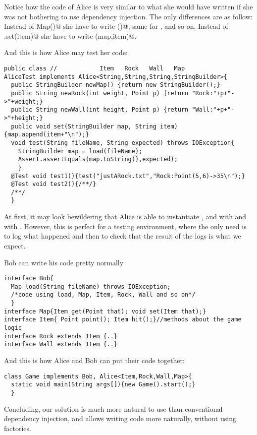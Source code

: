 \documentclass[submission,copyright,creativecommons]{eptcs}
\begin{document}
Notice how the code of Alice is very similar to what she would have written
if she was not bothering to use dependency injection. The
only differences are as follow:
Instead of \Q@new Map()@ she have to write \Q@newMap()@; same for
\Q@Rock@, \Q@Wall@ and so on.
Instead of \Q@map.set(item)@ she have to write \Q@set(map,item)@.

And this is how Alice may test her code:
\begin{lstlisting}
public class //            Item   Rock   Wall   Map
AliceTest implements Alice<String,String,String,StringBuilder>{
  public StringBuilder newMap() {return new StringBuilder();}
  public String newRock(int weight, Point p) {return "Rock:"+p+"->"+weight;}
  public String newWall(int height, Point p) {return "Wall:"+p+"->"+height;}
  public void set(StringBuilder map, String item) {map.append(item+"\n");}
  void test(String fileName, String expected) throws IOException{
    StringBuilder map = load(fileName);
    Assert.assertEquals(map.toString(),expected);
    }
  @Test void test1(){test("justARock.txt","Rock:Point(5,6)->35\n");}
  @Test void test2(){/**/}
  /**/
  }
\end{lstlisting}
At first, it may look bewildering that Alice is able to instantiate
\Q@Item@, \Q@Rock@ and \Q@Wall@ with \Q@String@ and \Q@Map@ with
\Q@StringBuilder@. However, this is perfect for a testing environment, where
the only need is to log what happened and then to check that the result
of the logs is what we expect.

Bob can write his code pretty normally
\begin{lstlisting}
interface Bob{
  Map load(String fileName) throws IOException;
  /*code using load, Map, Item, Rock, Wall and so on*/
  }
interface Map{Item get(Point that); void set(Item that);}
interface Item{ Point point(); Item hit();}//methods about the game logic
interface Rock extends Item {..}
interface Wall extends Item {..}
\end{lstlisting}
And this is how Alice and Bob can put their code together:

\begin{lstlisting}
class Game implements Bob, Alice<Item,Rock,Wall,Map>{
  static void main(String args[]){new Game().start();}
  }
\end{lstlisting}


Concluding, our solution is much more natural to use than conventional dependency injection,
and allows writing code more naturally, without using factories.
\end{document}

